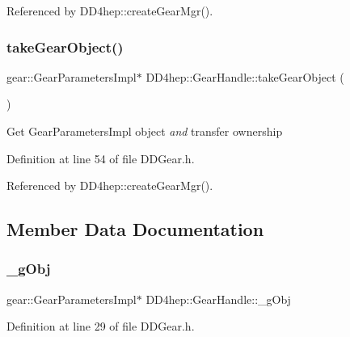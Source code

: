 Referenced by D\+D4hep\+::create\+Gear\+Mgr().

\hypertarget{class_d_d4hep_1_1_gear_handle_a6dc3d8b5eaadccd2a6fa8c8e31739cbd}{}\label{class_d_d4hep_1_1_gear_handle_a6dc3d8b5eaadccd2a6fa8c8e31739cbd} 
\subsubsection{\texorpdfstring{take\+Gear\+Object()}{takeGearObject()}}
{\footnotesize\ttfamily gear\+::\+Gear\+Parameters\+Impl$\ast$ D\+D4hep\+::\+Gear\+Handle\+::take\+Gear\+Object (\begin{DoxyParamCaption}{ }\end{DoxyParamCaption})\hspace{0.3cm}{\ttfamily [inline]}}

Get Gear\+Parameters\+Impl object {\itshape and} transfer ownership 

Definition at line 54 of file D\+D\+Gear.\+h.



Referenced by D\+D4hep\+::create\+Gear\+Mgr().



\subsection{Member Data Documentation}
\hypertarget{class_d_d4hep_1_1_gear_handle_a211b76e59d3561a189c0f5b3b7186d08}{}\label{class_d_d4hep_1_1_gear_handle_a211b76e59d3561a189c0f5b3b7186d08} 
\subsubsection{\texorpdfstring{\+\_\+g\+Obj}{\_gObj}}
{\footnotesize\ttfamily gear\+::\+Gear\+Parameters\+Impl$\ast$ D\+D4hep\+::\+Gear\+Handle\+::\+\_\+g\+Obj\hspace{0.3cm}{\ttfamily [protected]}}



Definition at line 29 of file D\+D\+Gear.\+h.

\hypertarget{class_d_d4hep_1_1_gear_handle_a7a666fef6469ba28d864d41e16000c29}{}\label{class_d_d4hep_1_1_gear_handle_a7a666fef6469ba28d864d41e16000c29} 
